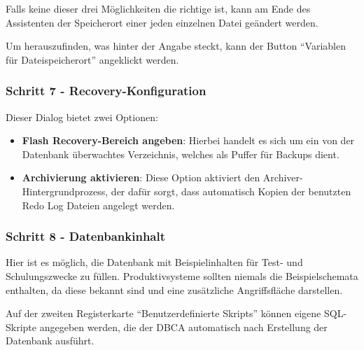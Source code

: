           Falls keine dieser drei Möglichkeiten die richtige ist, kann am Ende des Assistenten der Speicherort einer jeden einzelnen Datei geändert werden.

          Um herauszufinden, was hinter der Angabe  steckt, kann der Button \enquote{Variablen für Dateispeicherort} angeklickt werden.
		  \clearpage
        \subsubsection{Schritt 7 - Recovery-Konfiguration}
          Dieser Dialog bietet zwei Optionen:
          \begin{itemize}
            \item \textbf{Flash Recovery-Bereich angeben}: Hierbei handelt es sich um ein von der Datenbank überwachtes Verzeichnis, welches als Puffer für Backups dient.
            \item \textbf{Archivierung aktivieren}: Diese Option aktiviert den Archiver-Hintergrundprozess, der dafür sorgt, dass automatisch Kopien der benutzten Redo Log Dateien angelegt werden.
          \end{itemize}
        \subsubsection{Schritt 8 - Datenbankinhalt}
          Hier ist es möglich, die Datenbank mit Beispielinhalten für Test-
          und Schulungszwecke zu füllen. Produktivsysteme sollten niemals die
          Beispielschemata enthalten, da diese bekannt sind und eine
          zusätzliche Angriffsfläche darstellen.

          Auf der zweiten Registerkarte \enquote{Benutzerdefinierte Skripts}
          können eigene SQL-Skripte angegeben werden, die der DBCA automatisch
          nach Erstellung der Datenbank ausführt.
